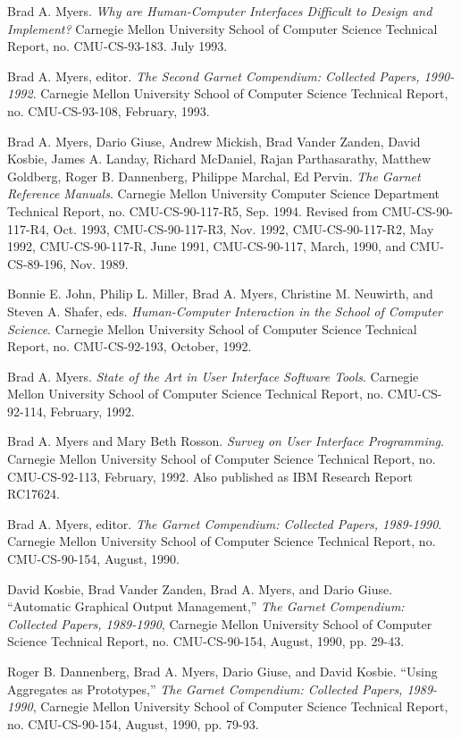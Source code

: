 Brad A. Myers.  {\it Why are Human-Computer Interfaces
Difficult to Design and Implement?}  Carnegie Mellon University School
of Computer Science Technical Report, no. CMU-CS-93-183.  July 1993.

Brad A. Myers, editor.  {\it The Second Garnet Compendium:
Collected Papers, 1990-1992}.  Carnegie Mellon University School of
Computer Science Technical Report, no. CMU-CS-93-108, February, 1993.

Brad A. Myers, Dario Giuse, Andrew Mickish, Brad Vander Zanden, David
Kosbie, James A. Landay, Richard McDaniel, Rajan Parthasarathy,
Matthew Goldberg, Roger B. Dannenberg, Philippe Marchal, Ed Pervin.
{\it The Garnet Reference Manuals}.  Carnegie Mellon University Computer
Science Department Technical Report, no. CMU-CS-90-117-R5, Sep. 1994.
Revised from CMU-CS-90-117-R4, Oct. 1993, CMU-CS-90-117-R3, Nov. 1992,
CMU-CS-90-117-R2, May 1992,
CMU-CS-90-117-R, June 1991, CMU-CS-90-117, March, 1990, and
CMU-CS-89-196, Nov. 1989.

Bonnie E. John, Philip L. Miller, Brad A. Myers, Christine M.
Neuwirth, and Steven A. Shafer, eds. {\it Human-Computer Interaction in
the School of Computer Science}.  Carnegie Mellon University School of
Computer Science Technical Report, no. CMU-CS-92-193, October, 1992.

Brad A. Myers. {\it State of the Art in User Interface Software Tools}.
Carnegie Mellon University School of Computer Science Technical
Report, no. CMU-CS-92-114, February, 1992.

Brad A. Myers and Mary Beth Rosson.  {\it Survey on User Interface
Programming}.  Carnegie Mellon University School of Computer Science
Technical Report, no. CMU-CS-92-113, February, 1992.  Also published
as IBM Research Report RC17624.

Brad A. Myers, editor.  {\it The Garnet Compendium: Collected Papers,
1989-1990}.  Carnegie Mellon University School of Computer Science
Technical Report, no. CMU-CS-90-154, August, 1990.

David Kosbie, Brad Vander Zanden, Brad A. Myers, and Dario Giuse.
``Automatic Graphical Output Management,'' {\it The Garnet Compendium:
Collected Papers, 1989-1990}, Carnegie Mellon University School of
Computer Science Technical Report, no. CMU-CS-90-154, August, 1990,
pp. 29-43.

Roger B. Dannenberg, Brad A. Myers, Dario Giuse, and David Kosbie.
``Using Aggregates as Prototypes,'' {\it The Garnet Compendium:
Collected Papers, 1989-1990}, Carnegie Mellon University School of
Computer Science Technical Report, no. CMU-CS-90-154, August, 1990,
pp. 79-93.

